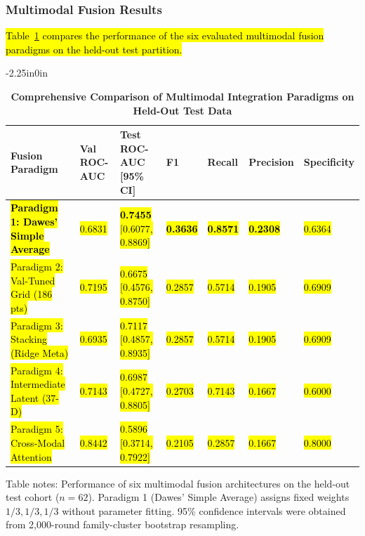 \documentclass[10pt,letterpaper]{article}
\begin{document}
\subsubsection*{Multimodal Fusion Results}
\hl{Table~\ref{tab:fusion_results} compares the performance of the six evaluated multimodal fusion paradigms on the held-out test partition.}

\begin{table}[!t]
\begin{adjustwidth}{-2.25in}{0in}
\centering
\caption{\textbf{Comprehensive Comparison of Multimodal Integration Paradigms on Held-Out Test Data}}
\label{tab:fusion_results}
\footnotesize
\renewcommand{\arraystretch}{1.15}
\begin{tabular}{|p{4.2cm}|p{2.6cm}|p{2.4cm}|p{1.4cm}|p{1.4cm}|p{1.4cm}|p{1.4cm}|}
\hline
\textbf{Fusion Paradigm} & \textbf{Val ROC-AUC} & \textbf{Test ROC-AUC [95\% CI]} & \textbf{F1} & \textbf{Recall} & \textbf{Precision} & \textbf{Specificity} \\
\hline
\textbf{\hl{Paradigm 1: Dawes' Simple Average}} & \hl{0.6831} & \textbf{\hl{0.7455}} \hl{[0.6077, 0.8869]} & \textbf{\hl{0.3636}} & \textbf{\hl{0.8571}} & \textbf{\hl{0.2308}} & \hl{0.6364} \\
\hline
\hl{Paradigm 2: Val-Tuned Grid (186 pts)} & \hl{0.7195} & \hl{0.6675 [0.4576, 0.8750]} & \hl{0.2857} & \hl{0.5714} & \hl{0.1905} & \hl{0.6909} \\
\hline
\hl{Paradigm 3: Stacking (Ridge Meta)} & \hl{0.6935} & \hl{0.7117 [0.4857, 0.8935]} & \hl{0.2857} & \hl{0.5714} & \hl{0.1905} & \hl{0.6909} \\
\hline
\hl{Paradigm 4: Intermediate Latent (37-D)} & \hl{0.7143} & \hl{0.6987 [0.4727, 0.8805]} & \hl{0.2703} & \hl{0.7143} & \hl{0.1667} & \hl{0.6000} \\
\hline
\hl{Paradigm 5: Cross-Modal Attention} & \hl{0.8442} & \hl{0.5896 [0.3714, 0.7922]} & \hl{0.2105} & \hl{0.2857} & \hl{0.1667} & \hl{0.8000} \\
\hline
\end{tabular}
\begin{flushleft}
Table notes: Performance of six multimodal fusion architectures on the held-out test cohort ($n=62$). Paradigm 1 (Dawes' Simple Average) assigns fixed weights $1/3, 1/3, 1/3$ without parameter fitting. 95\% confidence intervals were obtained from 2,000-round family-cluster bootstrap resampling.
\end{flushleft}
\end{adjustwidth}
\end{table}
\end{document}
